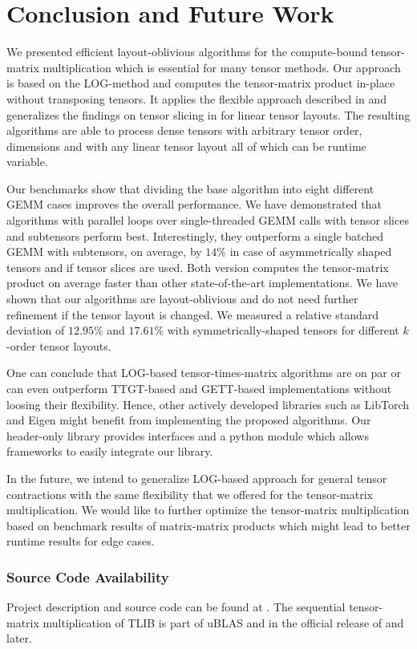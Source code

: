 \section{Conclusion and Future Work}
\label{sec:conclusion}
We presented efficient layout-oblivious algorithms for the compute-bound tensor-matrix multiplication which is essential for many tensor methods.
Our approach is based on the LOG-method and computes the tensor-matrix product in-place without transposing tensors.
It applies the flexible approach described in \cite{bassoy:2019:ttv} and generalizes the findings on tensor slicing in \cite{li:2015:input} for linear tensor layouts.
The resulting algorithms are able to process dense tensors with arbitrary tensor order, dimensions and with any linear tensor layout all of which can be runtime variable.

Our benchmarks show that dividing the base algorithm into eight different GEMM cases improves the overall performance.
We have demonstrated that algorithms with parallel loops over single-threaded GEMM calls with tensor slices and subtensors perform best.
Interestingly, they outperform a single batched GEMM with subtensors, on average, by $14$\% in case of asymmetrically shaped tensors and if tensor slices are used.
Both version computes the tensor-matrix product on average faster than other state-of-the-art implementations.
We have shown that our algorithms are layout-oblivious and do not need further refinement if the tensor layout is changed. 
We measured a relative standard deviation of $12.95$\% and $17.61$\% with symmetrically-shaped tensors for different $k$-order tensor layouts.

One can conclude that LOG-based tensor-times-matrix algorithms are on par or can even outperform TTGT-based and GETT-based implementations without loosing their flexibility.
Hence, other actively developed libraries such as LibTorch and Eigen might benefit from implementing the proposed algorithms.
Our header-only library provides  interfaces and a python module which allows frameworks to easily integrate our library.

In the future, we intend to generalize LOG-based approach for general tensor contractions with the same flexibility that we offered for the tensor-matrix multiplication. 
We would like to further optimize the tensor-matrix multiplication based on benchmark results of matrix-matrix products which might lead to better runtime results for edge cases.

\subsubsection{Source Code Availability}
Project description and source code can be found at {\footnotesize {}}.
The sequential tensor-matrix multiplication of TLIB is part of uBLAS and in the official release of   and later.
